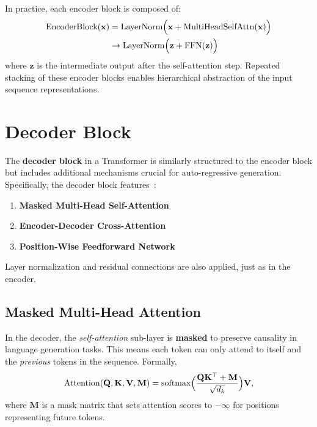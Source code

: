 \noindent
In practice, each encoder block is composed of:
\begin{equation}\label{eq:encoder_block}
\begin{aligned}
\text{EncoderBlock}(\mathbf{x}) &= \text{LayerNorm}\Bigl(\mathbf{x} + \text{MultiHeadSelfAttn}(\mathbf{x})\Bigr) \\
&\rightarrow \text{LayerNorm}\Bigl(\mathbf{z} + \text{FFN}(\mathbf{z})\Bigr)
\end{aligned}
\end{equation}
where $\mathbf{z}$ is the intermediate output after the self-attention step. Repeated stacking of these encoder blocks enables hierarchical abstraction of the input sequence representations.


\section{Decoder Block}
\label{sec:decoder_block}

\noindent
The \textbf{decoder block} in a Transformer is similarly structured to the encoder block but includes additional mechanisms crucial for auto-regressive generation. Specifically, the decoder block features~\cite{liu2019roberta}:
\begin{enumerate}
    \item \textbf{Masked Multi-Head Self-Attention}
    \item \textbf{Encoder-Decoder Cross-Attention}
    \item \textbf{Position-Wise Feedforward Network}
\end{enumerate}
Layer normalization and residual connections are also applied, just as in the encoder.

\subsection{Masked Multi-Head Attention}
\noindent
In the decoder, the \emph{self-attention} sub-layer is \textbf{masked} to preserve causality in language generation tasks. This means each token can only attend to itself and the \emph{previous} tokens in the sequence. Formally,
\[
\text{Attention}(\mathbf{Q}, \mathbf{K}, \mathbf{V}, \mathbf{M}) 
= \text{softmax}\Bigl(\frac{\mathbf{Q}\mathbf{K}^\top + \mathbf{M}}{\sqrt{d_k}}\Bigr)\mathbf{V},
\]
where $\mathbf{M}$ is a mask matrix that sets attention scores to $-\infty$ for positions representing future tokens.

